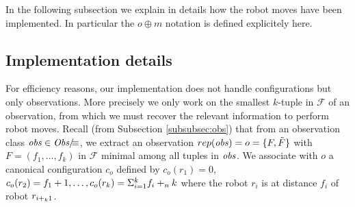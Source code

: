 In the following subsection we explain in details how the robot moves have been implemented. 
In particular the  $o \oplus m$ notation is defined explicitely
 here.

\subsection {Implementation details}
\label{subsec:implemSync}


For efficiency reasons, our implementation does not handle configurations but only observations. 
More precisely we only work on the smallest $k$-tuple in $\mathcal{F}$ of an observation, 
from which we must recover the relevant information to perform robot moves.
Recall (from Subsection \ref{subsubsec:obs}) that from an observation class
$\mathit{obs} \in \textit{Obs}/\!\!\!\equiv$, we extract an observation $rep(\mathit{obs}) = o =
\{F, \tilde{F}\}$ with $F=(f_1, \dots, f_k)$ in $\mathcal{F}$ minimal among all tuples in $\mathit{obs}$.
We associate with $o$ a canonical configuration 
$c_o$ defined by $c_o(r_1)=0$, $c_o(r_2)=f_1+1, \dots, 
 c_o(r_k) = \Sigma_{i=1}^k f_i +_n k$ 
where the robot $r_i$ is at distance $f_i$ of robot $r_{i +_k 1}$.  

